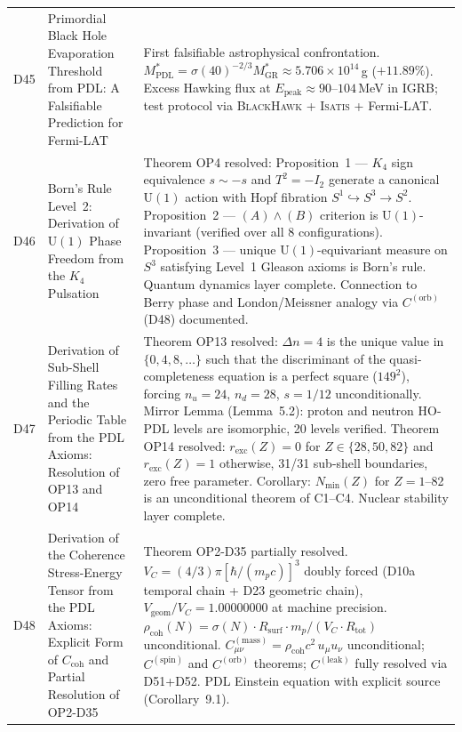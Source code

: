 \documentclass[11pt,a4paper]{article}
\theoremstyle{plain}
\theoremstyle{definition}
\theoremstyle{remark}
\newcommand{\Rsurf}{R_{\mathrm{surf}}}
\newcommand{\Rtot}{R_{\mathrm{tot}}}
\newcommand{\rhocoh}{\rho_{\mathrm{coh}}}
\newcommand{\Ccoh}{C_{\mathrm{coh}}}
\begin{document}
\begin{longtable}{L{1.3cm}L{3.8cm}L{8.0cm}}
D45 & Primordial Black Hole Evaporation Threshold from PDL: A Falsifiable Prediction for Fermi-LAT~\cite{D45} & First falsifiable astrophysical confrontation. $M^*_{\mathrm{PDL}} = \sigma(40)^{-2/3} M^*_{\mathrm{GR}} \approx 5.706 \times 10^{14}$\,g ($+11.89\%$). Excess Hawking flux at $E_{\mathrm{peak}} \approx 90$--$104$\,MeV in IGRB; test protocol via \textsc{BlackHawk} + \textsc{Isatis} + Fermi-LAT.\\[0.4em]
D46 & Born's Rule Level~2: Derivation of $\mathrm{U}(1)$ Phase Freedom from the $K_4$ Pulsation~\cite{D46} & \textcolor{proofblue}{Theorem} OP4 resolved: Proposition~1 — $K_4$ sign equivalence $s \sim -s$ and $T^2=-I_2$ generate a canonical $\mathrm{U}(1)$ action with Hopf fibration $S^1\hookrightarrow S^3\to S^2$. Proposition~2 — $(A)\wedge(B)$ criterion is $\mathrm{U}(1)$-invariant (verified over all 8 configurations). Proposition~3 — unique $\mathrm{U}(1)$-equivariant measure on $S^3$ satisfying Level~1 Gleason axioms is Born's rule. Quantum dynamics layer complete. Connection to Berry phase and London/Meissner analogy via $C^{(\mathrm{orb})}$ (D48) documented.\\[0.4em]
D47 & Derivation of Sub-Shell Filling Rates and the Periodic Table from the PDL Axioms: Resolution of OP13 and OP14~\cite{D47} & \textcolor{proofblue}{Theorem} OP13 resolved: $\Delta n=4$ is the unique value in $\{0,4,8,\ldots\}$ such that the discriminant of the quasi-completeness equation is a perfect square ($149^2$), forcing $n_u=24$, $n_d=28$, $s=1/12$ unconditionally. Mirror Lemma (Lemma~5.2): proton and neutron HO-PDL levels are isomorphic, 20 levels verified. \textcolor{proofblue}{Theorem} OP14 resolved: $r_{\mathrm{exc}}(Z)=0$ for $Z\in\{28,50,82\}$ and $r_{\mathrm{exc}}(Z)=1$ otherwise, 31/31 sub-shell boundaries, zero free parameter. Corollary: $N_{\min}(Z)$ for $Z=1$--82 is an unconditional theorem of C1--C4. Nuclear stability layer complete.\\[0.4em]
D48 & Derivation of the Coherence Stress-Energy Tensor from the PDL Axioms: Explicit Form of $\Ccoh$ and Partial Resolution of OP2-D35~\cite{D48} & \textcolor{proofblue}{Theorem} OP2-D35 partially resolved. $V_C=(4/3)\pi[\hbar/(m_p c)]^3$ doubly forced (D10a temporal chain + D23 geometric chain), $V_{\mathrm{geom}}/V_C=1.00000000$ at machine precision. $\rhocoh(N)=\sigma(N)\cdot\Rsurf\cdot m_p/(V_C\cdot\Rtot)$ unconditional. $C^{(\mathrm{mass})}_{\mu\nu}=\rhocoh c^2\,u_\mu u_\nu$ unconditional; $C^{(\mathrm{spin})}$ and $C^{(\mathrm{orb})}$ theorems; $C^{(\mathrm{leak})}$ fully resolved via D51+D52. PDL Einstein equation with explicit source (Corollary~9.1).\\[0.4em]

\end{longtable}
\end{document}
